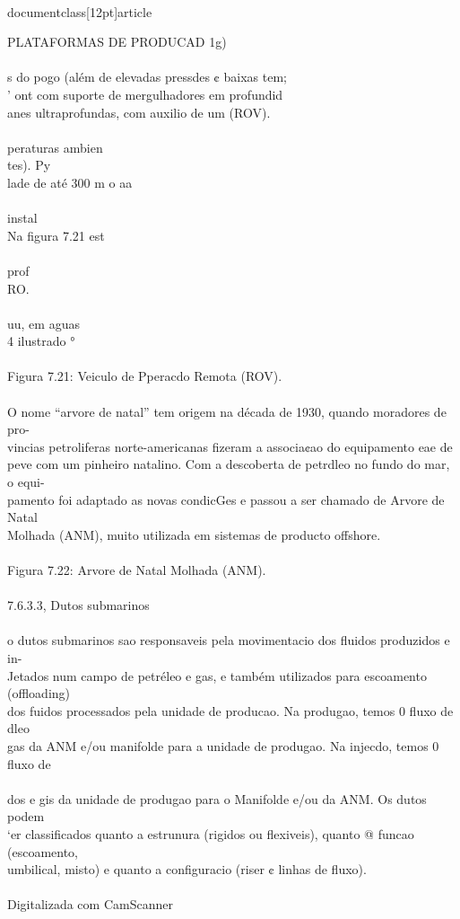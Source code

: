 \\documentclass[12pt]{article}
\begin{document}
PLATAFORMAS DE PRODUCAD 1g)\\
\\
s do pogo (além de elevadas pressdes ¢ baixas tem;\\
' ont com suporte de mergulhadores em profundid\\
anes ultraprofundas, com auxilio de um (ROV).\\
\\
peraturas ambien\\
tes). Py\\
lade de até 300 m o aa\\
\\
instal\\
Na figura 7.21 est\\
\\
prof\\
RO.\\
\\
uu, em aguas\\
4 ilustrado °\\
\\
Figura 7.21: Veiculo de Pperacdo Remota (ROV).\\
\\
O nome “arvore de natal” tem origem na década de 1930, quando moradores de pro-\\
vincias petroliferas norte-americanas fizeram a associa¢ao do equipamento eae de\\
peve com um pinheiro natalino. Com a descoberta de petrdleo no fundo do mar, o equi-\\
pamento foi adaptado as novas condicGes e passou a ser chamado de Arvore de Natal\\
Molhada (ANM), muito utilizada em sistemas de producto offshore.\\
\\
Figura 7.22: Arvore de Natal Molhada (ANM).\\
\\
7.6.3.3, Dutos submarinos\\
\\
o dutos submarinos sao responsaveis pela movimentacio dos fluidos produzidos e in-\\
Jetados num campo de petréleo e gas, e também utilizados para escoamento (offloading)\\
dos fuidos processados pela unidade de producao. Na produgao, temos 0 fluxo de dleo\\
gas da ANM e/ou manifolde para a unidade de produgao. Na injecdo, temos 0 fluxo de\\
\\
dos e gis da unidade de produgao para o Manifolde e/ou da ANM. Os dutos podem\\
‘er classificados quanto a estrunura (rigidos ou flexiveis), quanto @ funcao (escoamento,\\
umbilical, misto) e quanto a configuracio (riser ¢ linhas de fluxo).\\
\\
Digitalizada com CamScanner\\
\end{document}
